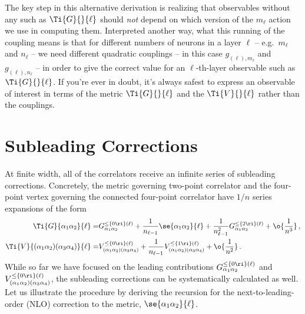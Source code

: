 The key step in this alternative derivation is realizing that observables without any  such as $\Ti{G}{}{\ell}$ should \emph{not} depend on which version of the $m_{\ell}$ action we use in computing them.  Interpreted another way, what this running of the coupling means is that for different numbers of neurons in a layer $\ell$ -- e.g.~$m_\ell$ and $n_\ell$ -- we need different quadratic couplings -- in this case $g_{(\ell),m_{\ell}}$ and $g_{(\ell),n_{\ell}}$ -- in order to give the correct value for an $\ell$-th-layer observable such as $\Ti{G}{}{\ell}$.
If you're ever in doubt, it's always safest to express an observable of interest in terms of the metric $\Ti{G}{}{\ell}$ and the  $\Ti{V}{}{\ell}$ rather than the couplings. %




\section{Subleading Corrections}
\label{sec:loop-correction}
At finite width, all of the correlators receive an infinite series of subleading corrections. Concretely, the metric governing two-point correlator and the four-point vertex governing the connected four-point correlator have $1/n$ series expansions of the form
\begin{align}\label{eq:self-energy-decomposition}
\Ti{G}{\alpha_1\alpha_2}{\ell}=&G_{\alpha_1\alpha_2}^{\le\{0\ri\}(\ell)}+\frac{1}{n_{\ell-1}}\se{\alpha_1\alpha_2}{\ell}+\frac{1}{n_{\ell-1}^2}G_{\alpha_1\alpha_2}^{\le\{2\ri\}(\ell)}+\o{\frac{1}{n^3}}\, ,\\
\label{eq:vertex-decomposition}
\Ti{V}{(\alpha_1\alpha_2)(\alpha_3\alpha_4)}{\ell}=&V_{(\alpha_1\alpha_2)(\alpha_3\alpha_4)}^{\le\{0\ri\}(\ell)}+\frac{1}{n_{\ell-1}}V_{(\alpha_1\alpha_2)(\alpha_3\alpha_4)}^{\le\{1\ri\}(\ell)}+\o{\frac{1}{n^2}}\, .
\end{align}
While so far we have focused on the leading contributions $G_{\alpha_1\alpha_2}^{\le\{0\ri\}(\ell)}$ and $V_{(\alpha_1\alpha_2)(\alpha_3\alpha_4)}^{\le\{0\ri\}(\ell)}$, the subleading corrections can be systematically calculated as well. Let us illustrate the procedure by deriving the recursion for the next-to-leading-order (NLO) correction to the metric, $\se{\alpha_1\alpha_2}{\ell}$.


